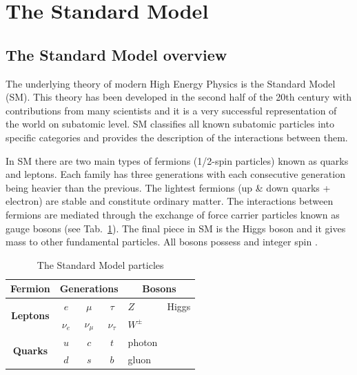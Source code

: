 \section{The Standard Model}
\label{SM}
\subsection{The Standard Model overview}
The underlying theory of modern High Energy Physics is the Standard Model (SM). This theory has been developed in the second half of the 20th century with contributions from many scientists and it is a very successful representation of the world on subatomic level.
SM classifies all known subatomic particles into specific categories and provides the description of the interactions between them. 

In SM there are two main types of fermions (1/2-spin particles) known as quarks and leptons. Each family has three generations with each consecutive generation being heavier than the previous. The lightest fermions (up \& down quarks + electron)
are stable and constitute ordinary matter. The interactions between fermions are mediated through the exchange of force carrier particles known as gauge bosons (see Tab.~\ref{tab:SM}). The final piece in SM is the Higgs boson and it gives mass to other fundamental particles. All bosons possess and integer spin \citep{martin2006nuclear}. 
\begin{table}[]
\centering
\label{my-label}
\begin{tabular}{cccc | ll}
\textbf{Fermion}                  & \multicolumn{3}{c}{\textbf{Generations}} & \multicolumn{2}{c}{\textbf{Bosons}} \\ \hline
\multirow{2}{*}{\textbf{Leptons}} & $e$        & $\mu$        & $\tau$       & $Z$            & Higgs           \\
                                  & $\nu_{e}$  & $\nu_{\mu}$  & $\nu_{\tau}$ & $W^{\pm}$            &                 \\ 
\multirow{2}{*}{\textbf{Quarks}}  & $u$        & $c$          & $t$          & photon            &                 \\
                                  & $d$        & $s$          & $b$          & gluon             &          \\ \hline      
\end{tabular}
\caption{The Standard Model particles}
\label{tab:SM}
\end{table}

